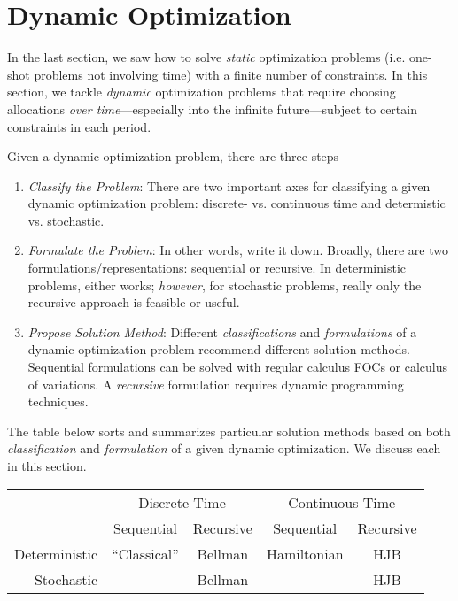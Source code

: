 \documentclass[12pt]{book}
\numberwithin{equation}{section} %
\theoremstyle{plain}
\theoremstyle{definition}
\theoremstyle{remark}
\begin{document}



\clearpage
\section{Dynamic Optimization}

In the last section, we saw how to solve \emph{static} optimization
problems (i.e. one-shot problems not involving time) with a finite
number of constraints.
In this section, we tackle \emph{dynamic} optimization problems that
require choosing allocations \emph{over time}---especially into the
infinite future---subject to certain constraints in each period.

Given a dynamic optimization problem, there are three steps
\begin{enumerate}[label=(\roman*)]
  \item \emph{Classify the Problem}:
    There are two important axes for classifying a given dynamic
    optimization problem: discrete- vs. continuous time and determistic
    vs. stochastic.
  \item \emph{Formulate the Problem}: In other words, write it down.
    Broadly, there are two formulations/representations: sequential or
    recursive.
    In deterministic problems, either works; \emph{however}, for
    stochastic problems, really only the recursive approach is feasible
    or useful.
  \item \emph{Propose Solution Method}:
    Different \emph{classifications} and \emph{formulations} of a
    dynamic optimization problem recommend different solution methods.
    Sequential formulations can be solved with regular calculus FOCs or
    calculus of variations. A \emph{recursive} formulation requires
    dynamic programming techniques.
\end{enumerate}
The table below sorts and summarizes particular solution methods based
on both \emph{classification} and \emph{formulation} of a given dynamic
optimization. We discuss each in this section.
\begin{table}[htbp!]
\centering
\begin{tabular}{|r|cc|cc|}
  \hline
  & \multicolumn{2}{c}{Discrete Time}
  & \multicolumn{2}{|c|}{Continuous Time} \\\cline{2-3}\cline{4-5}
  & Sequential & Recursive & Sequential & Recursive \\\hline\hline
  Deterministic & ``Classical'' & Bellman & Hamiltonian & HJB \\\hline
  Stochastic & &Bellman & &HJB \\\hline
\end{tabular}
\end{table}
\end{document}
